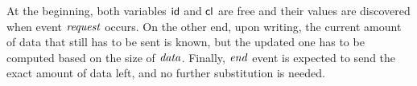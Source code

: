 At the beginning, both variables \(\mathsf{id}\) and \(\mathsf{cl}\) are free and their values are discovered when event \(\mathit{request}\) occurs.
On the other end, upon writing, the current amount of data that still has to be sent is known, but the updated one has to be computed based on the
size of $\mathit{data}$.
Finally, \(\mathit{end}\) event is expected to send the exact amount of data left, and no further substitution is needed.
